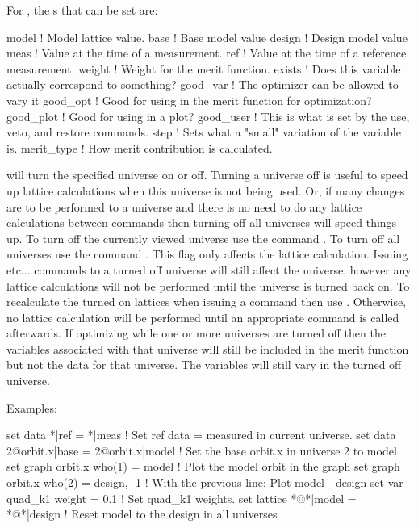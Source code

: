 For , the s that can be set are:
\begin{example}
  model       ! Model lattice value.
  base        ! Base model value
  design      ! Design model value
  meas        ! Value at the time of a measurement.
  ref         ! Value at the time of a reference measurement.
  weight      ! Weight for the merit function.
  exists      ! Does this variable actually correspond to something?
  good_var    ! The optimizer can be allowed to vary it
  good_opt    ! Good for using in the merit function for optimization?
  good_plot   ! Good for using in a plot?
  good_user   ! This is what is set by the use, veto, and restore commands.
  step        ! Sets what a "small" variation of the variable is.
  merit_type  ! How merit contribution is calculated.
\end{example}
\vskip 0.2in

 will turn the specified universe on or off. Turning
a universe off is useful to speed up lattice calculations when this
universe is not being used. Or, if many changes are to be performed to
a universe and there is no need to do any lattice calculations between
commands then turning off all universes will speed things up. To turn off 
the currently viewed universe use the command . 
To turn off all universes use the command . 
This flag only affects the lattice calculation. 
Issuing  etc...  commands to a turned off universe
will still affect the
universe, however any lattice calculations will not be performed until
the universe is turned back on.  To recalculate the turned on lattices
when issuing a  command then use . Otherwise, no lattice calculation will
be performed until an appropriate command is called afterwards.  If
optimizing while one or more universes are turned off then the
variables associated with that universe will still be included in the
merit function but not the data for that universe. The variables will
still vary in the turned off universe.

Examples:
\begin{example}
  set data *|ref = *|meas               ! Set ref data = measured in current universe.
  set data 2@orbit.x|base = 2@orbit.x|model 
                                        ! Set the base orbit.x in universe 2 to model
  set graph orbit.x who(1) = model      ! Plot the model orbit in the graph
  set graph orbit.x who(2) = design, -1 ! With the previous line: Plot model - design 
  set var quad\_k1 weight = 0.1         ! Set quad\_k1 weights. 
  set lattice *@*|model = *@*|design    ! Reset model to the design in all universes
\end{example}


